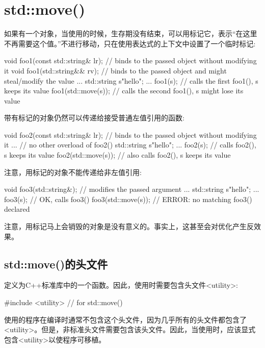 \section{std::move()}
如果有一个对象，当使用的时候，生存期没有结束，可以用标记它，表示“在这里不再需要这个值。”不进行移动，只在使用表达式的上下文中设置了一个临时标记:

\begin{cppcode}
void foo1(const std::string& lr); // binds to the passed object without modifying it
void foo1(std::string&& rv); // binds to the passed object and might steal/modify the value
...
std::string s{"hello"};
...
foo1(s); // calls the first foo1(), s keeps its value
foo1(std::move(s)); // calls the second foo1(), s might lose its value
\end{cppcode}

带有标记的对象仍然可以传递给接受普通左值引用的函数:

\begin{cppcode}
void foo2(const std::string& lr); // binds to the passed object without modifying it
... // no other overload of foo2()
std::string s{"hello"};
...
foo2(s); // calls foo2(), s keeps its value
foo2(std::move(s)); // also calls foo2(), s keeps its value
\end{cppcode}

注意，用标记的对象不能传递给非左值引用:

\begin{cppcode}
void foo3(std::string&); // modifies the passed argument
...
std::string s{"hello"};
...
foo3(s); // OK, calls foo3()
foo3(std::move(s)); // ERROR: no matching foo3() declared
\end{cppcode}

注意，用标记马上会销毁的对象是没有意义的。事实上，这甚至会对优化产生反效果。

\subsection{std::move()的头文件}

定义为C++标准库中的一个函数。因此，使用时需要包含头文件<utility>:

\begin{cppcode}
#include <utility> // for std::move()
\end{cppcode}

使用的程序在编译时通常不包含这个头文件，因为几乎所有的头文件都包含了<utility>。但是，非标准头文件需要包含该头文件。因此，当使用时，应该显式包含<utility>以使程序可移植。

